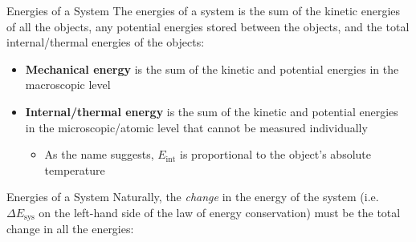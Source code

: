 \documentclass[12pt,compress,aspectratio=169]{beamer}
\begin{document}
\begin{frame}{Energies of a System}
  The energies of a system is {\color{magenta}the sum of the kinetic energies of
    all the objects}, any {\color{blue}potential energies stored between the
    objects}, and the {\color{orange}total internal/thermal energies} of the
  objects:

  \begin{itemize}
  \item\textbf{Mechanical energy} is the sum of the kinetic and potential
    energies in the macroscopic level
  \item\textbf{Internal/thermal energy} is the sum of the kinetic and potential
    energies in the microscopic/atomic level that cannot be measured
    individually
    \begin{itemize}
    \item As the name suggests, $E_\text{int}$ is proportional to the object's
      absolute temperature
    \end{itemize}
  \end{itemize}
\end{frame}



\begin{frame}{Energies of a System}
  Naturally, the \emph{change} in the energy of the system (i.e.\
  $\Delta E_\text{sys}$ on the left-hand side of the law of energy conservation)
  must be the total change in all the energies:
  
\end{frame}
\end{document}
